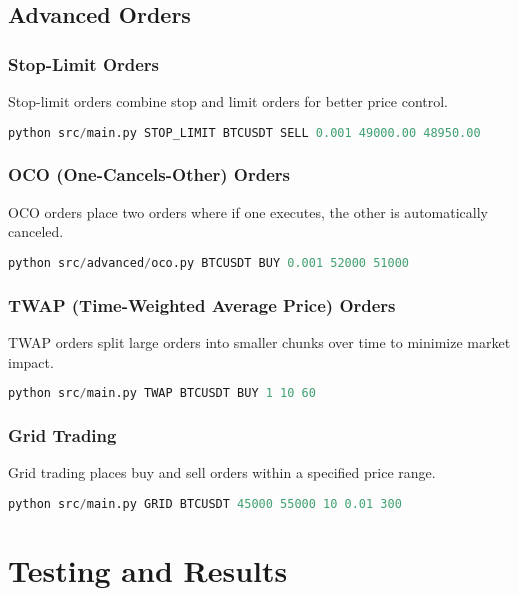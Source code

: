 \documentclass[12pt,a4paper]{article}
\begin{document}
\subsection{Advanced Orders}
\subsubsection{Stop-Limit Orders}
Stop-limit orders combine stop and limit orders for better price control.

\begin{lstlisting}[language=Python, caption=Stop-Limit Order Example]
python src/main.py STOP_LIMIT BTCUSDT SELL 0.001 49000.00 48950.00
\end{lstlisting}

\subsubsection{OCO (One-Cancels-Other) Orders}
OCO orders place two orders where if one executes, the other is automatically canceled.

\begin{lstlisting}[language=Python, caption=OCO Order Example]
python src/advanced/oco.py BTCUSDT BUY 0.001 52000 51000
\end{lstlisting}

\subsubsection{TWAP (Time-Weighted Average Price) Orders}
TWAP orders split large orders into smaller chunks over time to minimize market impact.

\begin{lstlisting}[language=Python, caption=TWAP Order Example]
python src/main.py TWAP BTCUSDT BUY 1 10 60
\end{lstlisting}

\subsubsection{Grid Trading}
Grid trading places buy and sell orders within a specified price range.

\begin{lstlisting}[language=Python, caption=Grid Trading Example]
python src/main.py GRID BTCUSDT 45000 55000 10 0.01 300
\end{lstlisting}

\section{Testing and Results}
\end{document}
